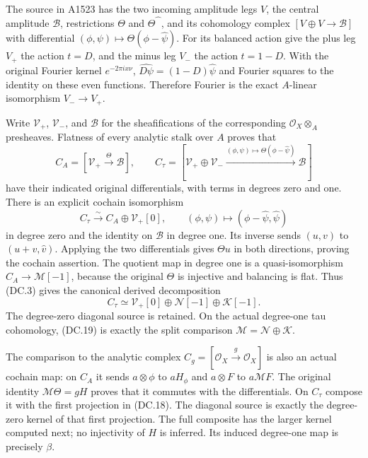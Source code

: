 The source in A1523 has the two incoming amplitude legs $V$,
the central amplitude $\mathscr B$, restrictions $\Theta$ and
$\Theta\widehat{\phantom\phi}$, and its cohomology complex
$[V\oplus V\to\mathscr B]$ with differential
$(\phi,\psi)\mapsto\Theta(\phi-\widehat\psi)$.
For its balanced action give the plus leg $V_+$ the action
$t=D$, and the minus leg $V_-$ the action $t=1-D$.
With the original Fourier kernel $e^{-2\pi ix\nu}$,
$\widehat{D\psi}=(1-D)\widehat\psi$ and Fourier squares to the
identity on these even functions.  Therefore Fourier is the exact
$A$-linear isomorphism $V_-\to V_+$.

Write $\mathcal V_+$, $\mathcal V_-$, and $\mathcal B$ for the
sheafifications of the corresponding $\mathcal O_X\otimes_A$
presheaves.  Flatness of every analytic stalk over $A$ proves that
\[
 C_A=[\mathcal V_+\xrightarrow{\Theta}\mathcal B],\qquad
 C_\tau=[\mathcal V_+\oplus\mathcal V_-
       \xrightarrow{(\phi,\psi)\mapsto\Theta(\phi-\widehat\psi)}
        \mathcal B]
 \tag{DC.17}
\]
have their indicated original differentials, with terms in degrees
zero and one.  There is an explicit cochain isomorphism
\[
 C_\tau\xrightarrow{\sim}C_A\oplus\mathcal V_+[0],
 \qquad (\phi,\psi)\longmapsto
             (\phi-\widehat\psi,\widehat\psi)
 \tag{DC.18}
\]
in degree zero and the identity on $\mathcal B$ in degree one.
Its inverse sends $(u,v)$ to $(u+v,\widehat v)$.  Applying the
two differentials gives $\Theta u$ in both directions, proving
the cochain assertion.  The quotient map in degree one is a
quasi-isomorphism $C_A\to\mathcal M[-1]$, because the original
$\Theta$ is injective and balancing is flat.  Thus (DC.3) gives
the canonical derived decomposition
\[
 C_\tau\simeq\mathcal V_+[0]\oplus\mathcal N[-1]
                         \oplus\mathcal K[-1].
 \tag{DC.19}
\]
The degree-zero diagonal source is retained.  On the actual
degree-one tau cohomology, (DC.19) is exactly the split comparison
$\mathcal M=\mathcal N\oplus\mathcal K$.

The comparison to the analytic complex
$C_g=[\mathcal O_X\xrightarrow{g}\mathcal O_X]$ is also an
actual cochain map: on $C_A$ it sends $a\otimes\phi$ to
$aH_\phi$ and $a\otimes F$ to $a\mathcal MF$.
The original identity $\mathcal M\Theta=gH$ proves that it
commutes with the differentials.  On $C_\tau$ compose it with
the first projection in (DC.18).  The diagonal source is exactly
the degree-zero kernel of that first projection.  The full composite
has the larger kernel computed next; no injectivity of $H$ is inferred.
Its induced degree-one map is precisely $\beta$.

